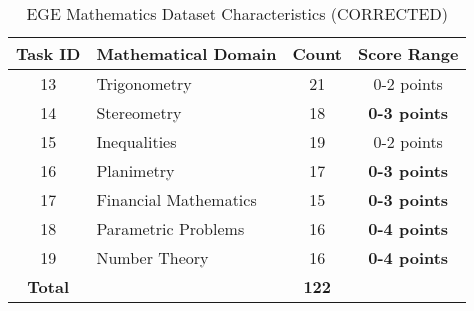 \documentclass{article}
\begin{document}
\begin{table}[htbp]
\centering
\caption{EGE Mathematics Dataset Characteristics (CORRECTED)}
\label{tab:dataset_characteristics_corrected}
\begin{tabular}{@{}clcc@{}}
\toprule
\textbf{Task ID} & \textbf{Mathematical Domain} & \textbf{Count} & \textbf{Score Range} \\
\midrule
13 & Trigonometry & 21 & 0-2 points \\
14 & Stereometry & 18 & \textbf{0-3 points} \\
15 & Inequalities & 19 & 0-2 points \\
16 & Planimetry & 17 & \textbf{0-3 points} \\
17 & Financial Mathematics & 15 & \textbf{0-3 points} \\
18 & Parametric Problems & 16 & \textbf{0-4 points} \\
19 & Number Theory & 16 & \textbf{0-4 points} \\
\midrule
\textbf{Total} & & \textbf{122} & \\
\bottomrule
\end{tabular}
\end{table}
\end{document}
